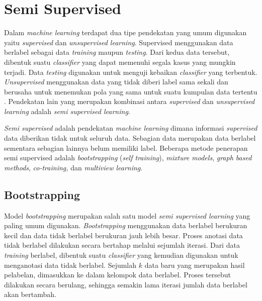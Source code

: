 \section{Semi Supervised}
Dalam \textit{machine learning} terdapat dua tipe pendekatan yang umum digunakan yaitu \textit{supervised} dan \textit{unsupervised learning}. Supervised menggunakan data berlabel sebagai data \textit{training} maupun \textit{testing}. Dari kedua data tersebut, dibentuk suatu \textit{classifier} yang dapat memenuhi segala kasus yang mungkin terjadi. Data \textit{testing} digunakan untuk menguji kebaikan \textit{classifier} yang terbentuk. \textit{Unsupervised} menggunakan data yang tidak diberi label sama sekali dan berusaha untuk menemukan pola yang sama untuk suatu kumpulan data tertentu \citep{prakash2014survey}. Pendekatan lain yang merupakan kombinasi antara \textit{supervised} dan \textit{unsupervised learning} adalah \textit{semi supervised learning}. 

\textit{Semi supervised} adalah pendekatan \textit{machine learning} dimana informasi \textit{supervised} data diberikan tidak untuk seluruh data. Sebagian data merupakan data berlabel sementara sebagian lainnya belum memiliki label. Beberapa metode penerapan semi supervised adalah \textit{bootstrapping} (\textit{self training}), \textit{mixture models}, \textit{graph based methods}, \textit{co-training,} dan \textit{multiview learning}.

\subsection{Bootstrapping}
Model \textit{bootstrapping} merupakan salah satu model \textit{semi supervised learning} yang paling umum digunakan. \textit{Bootstrapping} menggunakan data berlabel berukuran kecil dan data tidak berlabel berukuran jauh lebih besar. Proses anotasi data tidak berlabel dilakukan secara bertahap melalui sejumlah iterasi. Dari data \textit{training} berlabel, dibentuk suatu \textit{classifier} yang kemudian digunakan untuk menganotasi data tidak berlabel. Sejumlah $k$ data baru yang merupakan hasil pelabelan, dimasukkan ke dalam kelompok data berlabel. Proses tersebut dilakukan secara berulang, sehingga semakin lama iterasi jumlah data berlabel akan bertambah. 

